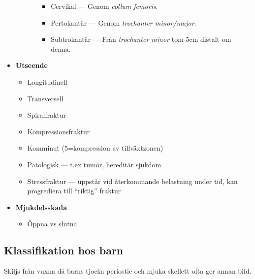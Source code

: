 \documentclass[
  letterpaper,
  DIV=11,
  numbers=noendperiod]{scrreport}
\providecommand{\tightlist}{%
  \setlength{\itemsep}{0pt}\setlength{\parskip}{0pt}}\usepackage{longtable,booktabs,array}
\begin{document}
\begin{itemize}
\begin{itemize}
\begin{itemize}
      \begin{itemize}
      \tightlist
      \item
        Cervikal --- Genom \emph{collum femoris}.
      \item
        Pertokantär --- Genom \emph{trochanter minor/major}.
      \item
        Subtrokantär --- Från \emph{trochanter minor} tom 5cm distalt om
        denna.
      \end{itemize}
    \end{itemize}
  \end{itemize}
\item
  \textbf{Utseende}

  \begin{itemize}
  \tightlist
  \item
    Longitudinell
  \item
    Transversell
  \item
    Spiralfraktur
  \item
    Kompressionsfraktur
  \item
    Komminut (5=kompression av tillväxtzonen)
  \item
    Patologisk --- t.ex tumör, hereditär sjukdom
  \item
    Stressfraktur --- uppstår vid återkommande belastning under tid, kan
    progrediera till ``riktig'' fraktur
  \end{itemize}
\item
  \textbf{Mjukdelsskada}

  \begin{itemize}
  \tightlist
  \item
    Öppna vs slutna
  \end{itemize}
\end{itemize}

\hypertarget{klassifikation-hos-barn}{%
\subsection{Klassifikation hos barn}\label{klassifikation-hos-barn}}

Skiljs från vuxna då barns tjocka periostie och mjuka skellett ofta ger
annan bild.
\end{document}
